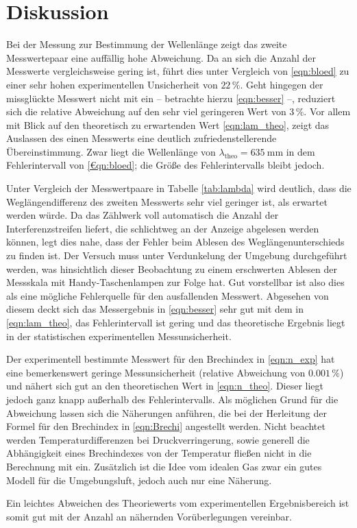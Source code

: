 \section{Diskussion}
\label{sec:Diskussion}

Bei der Messung zur Bestimmung der Wellenlänge zeigt das zweite Messwertepaar eine auffällig hohe Abweichung. 
Da an sich die Anzahl der Messwerte vergleichsweise gering ist, führt dies unter Vergleich von \eqref{eqn:bloed} zu einer sehr 
hohen experimentellen Unsicherheit von $22\,\%$. 
Geht hingegen der missglückte Messwert nicht mit ein -- betrachte hierzu \eqref{eqn:besser} --, reduziert sich die relative Abweichung auf den sehr viel geringeren Wert von $3\,\%$. 
Vor allem mit Blick auf den theoretisch zu erwartenden Wert \eqref{eqn:lam_theo}, zeigt das Auslassen des einen Messwerts 
eine deutlich zufriedenstellerende Übereinstimmung. 
Zwar liegt die Wellenlänge von $\lambda_\text{theo}=\SI{635}{\milli\meter}$ in dem Fehlerintervall von \eqref{€qn:bloed}; 
die Größe des Fehlerintervalls bleibt jedoch. 

Unter Vergleich der Messwertpaare in Tabelle \ref{tab:lambda} wird deutlich, dass die Weglängendifferenz des zweiten 
Messwerts sehr viel geringer ist, als erwartet werden würde. 
Da das Zählwerk voll automatisch die Anzahl der Interferenzstreifen liefert, die schlichtweg an der Anzeige abgelesen werden können, 
legt dies nahe, dass der Fehler beim Ablesen des Weglängenunterschieds zu finden ist. 
Der Versuch muss unter Verdunkelung der Umgebung durchgeführt werden, was hinsichtlich dieser Beobachtung zu einem erschwerten 
Ablesen der Messskala mit Handy-Taschenlampen zur Folge hat. 
Gut vorstellbar ist also dies als eine mögliche Fehlerquelle für den ausfallenden Messwert. 
Abgesehen von diesem deckt sich das Messergebnis in \eqref{eqn:besser} sehr gut mit dem in \eqref{eqn:lam_theo}, 
das Fehlerintervall ist gering und das theoretische Ergebnis liegt in der statistischen experimentellen Messunsicherheit. 

Der experimentell bestimmte Messwert für den Brechindex in \eqref{eqn:n_exp} hat eine bemerkenswert geringe Messunsicherheit 
(relative Abweichung von $0.001\,\%$)
und nähert sich gut an den theoretischen Wert in \eqref{eqn:n_theo}. 
Dieser liegt jedoch ganz knapp außerhalb des Fehlerintervalls. 
Als möglichen Grund für die Abweichung lassen sich die Näherungen anführen, die bei der Herleitung der Formel für den 
Brechindex in \eqref{eqn:Brechi} angestellt werden. 
Nicht beachtet werden Temperaturdifferenzen bei Druckverringerung, sowie generell die Abhängigkeit eines Brechindexes 
von der Temperatur fließen nicht in die Berechnung mit ein. 
Zusätzlich ist die Idee vom idealen Gas zwar ein gutes Modell für die Umgebungsluft, jedoch auch nur eine Näherung. 

Ein leichtes Abweichen des Theoriewerts vom experimentellen Ergebnisbereich ist somit gut mit der Anzahl an nähernden Vorüberlegungen vereinbar. 
